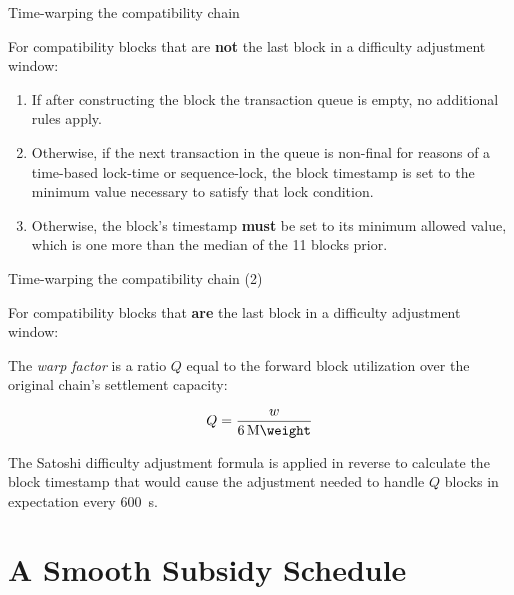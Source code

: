 \documentclass[10pt]{beamer}
\begin{document}
\begin{frame}{Time-warping the compatibility chain}

  For compatibility blocks that are \textbf{not} the last block in a
  difficulty adjustment window:

  \begin{enumerate}

  \item If after constructing the block the transaction queue is
    empty, no additional rules apply.

  \item Otherwise, if the next transaction in the queue is non-final
    for reasons of a time-based lock-time or sequence-lock, the block
    timestamp is set to the minimum value necessary to satisfy that
    lock condition.

  \item Otherwise, the block's timestamp \textbf{must} be set to its
    minimum allowed value, which is one more than the median of the
    \num{11} blocks prior.

  \end{enumerate}

\end{frame}

\begin{frame}{Time-warping the compatibility chain (2)}

  For compatibility blocks that \textbf{are} the last block in a
  difficulty adjustment window:

  The \emph{warp factor} is a ratio $Q$ equal to the forward block
  utilization over the original chain's settlement capacity:

  \begin{equation*}
    Q = \frac{w}{\SI{6}{\mega\weight}}
  \end{equation*}

  The Satoshi difficulty adjustment formula is applied in reverse to
  calculate the block timestamp that would cause the adjustment needed
  to handle $Q$ blocks in expectation every \SI{600}{\second}.

\end{frame}

\section{A Smooth Subsidy Schedule}
\end{document}

